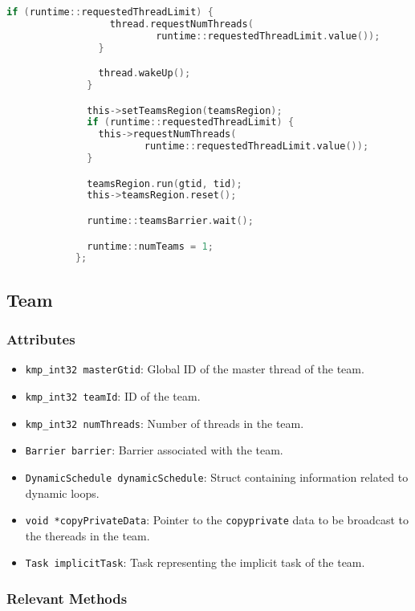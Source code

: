 \begin{itemize}
\begin{lstlisting}[language=C, caption={void Thread::forkTeams},
          label={lst:thread-forkTeams},
          escapechar=@]
                if (runtime::requestedThreadLimit) {
                  thread.requestNumThreads(
                          runtime::requestedThreadLimit.value());
                }

                thread.wakeUp();
              }

              this->setTeamsRegion(teamsRegion);
              if (runtime::requestedThreadLimit) {
                this->requestNumThreads(
                        runtime::requestedThreadLimit.value());
              }

              teamsRegion.run(gtid, tid);
              this->teamsRegion.reset();

              runtime::teamsBarrier.wait();

              runtime::numTeams = 1;
            };
    \end{lstlisting}

\end{itemize}

\subsection{Team}
\label{subsec:team}

\subsubsection{Attributes}

\begin{itemize}
	\item \texttt{kmp_int32 masterGtid}: Global ID of the master thread of the team.
	\item \texttt{kmp_int32 teamId}: ID of the team.
	\item \texttt{kmp_int32 numThreads}: Number of threads in the team.
	\item \texttt{Barrier barrier}: Barrier associated with the team.
	\item \texttt{DynamicSchedule dynamicSchedule}: Struct containing information related to dynamic
	      loops.
	\item \texttt{void *copyPrivateData}: Pointer to the \texttt{copyprivate} data to be
	      broadcast to the thereads in the team.
	\item \texttt{Task implicitTask}: Task representing the implicit task of the team.
\end{itemize}

\subsubsection{Relevant Methods}

